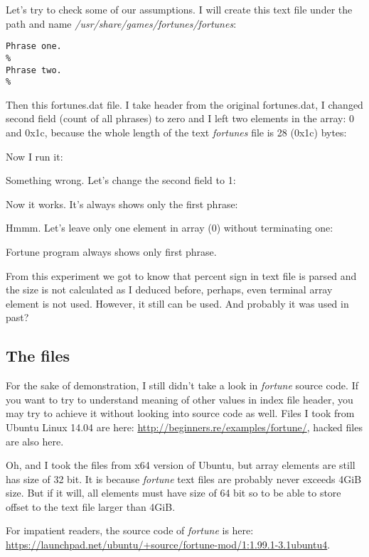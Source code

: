 Let's try to check some of our assumptions.
I will create this text file under the path and name \emph{/usr/share/games/fortunes/fortunes}:

\begin{lstlisting}
Phrase one.
%
Phrase two.
%
\end{lstlisting}

Then this fortunes.dat file. I take header from the original fortunes.dat, I changed second field (count of all phrases) to zero and I left two
elements in the array: 0 and 0x1c, because the whole length of the text \emph{fortunes} file is 28 (0x1c) bytes:



Now I run it:



Something wrong. Let's change the second field to 1:



Now it works. It's always shows only the first phrase:



Hmmm. Let's leave only one element in array (0) without terminating one:



Fortune program always shows only first phrase.

From this experiment we got to know that percent sign in text file is parsed and the size is not calculated as
I deduced before, perhaps, even terminal array element is not used.
However, it still can be used. And probably it was used in past?


\subsection{The files}

For the sake of demonstration, I still didn't take a look in \emph{fortune} source code.
If you want to try to understand meaning of other values in index file header, you may try to achieve it without looking into source code as well.
Files I took from Ubuntu Linux 14.04 are here: \url{http://beginners.re/examples/fortune/}, hacked files are also here.

Oh, and I took the files from x64 version of Ubuntu, but array elements are still has size of 32 bit.
It is because \emph{fortune} text files are probably never exceeds 4\ac{GiB} size.
But if it will, all elements must have size of 64 bit so to be able to store offset to the text file larger than 4GiB.

For impatient readers, the source code of \emph{fortune} is here:
\url{https://launchpad.net/ubuntu/+source/fortune-mod/1:1.99.1-3.1ubuntu4}.

